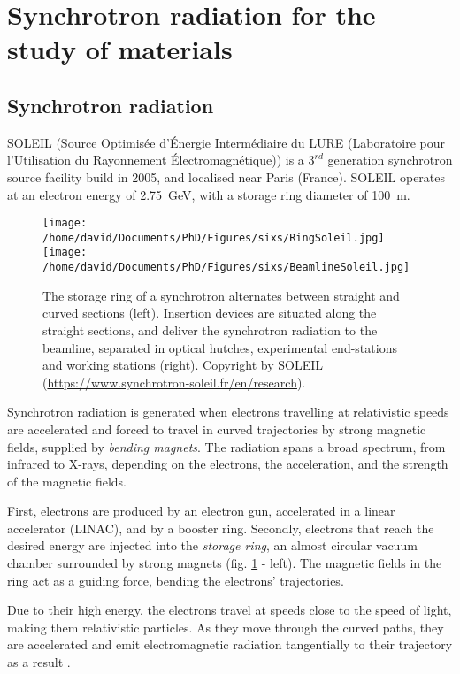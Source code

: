 \section{Synchrotron radiation for the study of materials} \label{sec:SIXS}

\subsection{Synchrotron radiation}

SOLEIL (Source Optimisée d’Énergie Intermédiaire du LURE (Laboratoire pour l’Utilisation du Rayonnement Électromagnétique)) is a $3^{rd}$ generation synchrotron source facility build in 2005, and localised near Paris (France).
SOLEIL operates at an electron energy of \qty{2.75}{\GeV}, with a storage ring diameter of \qty{100}{\m}.

\begin{figure}[!htb]
    \centering
    \texttt{[image: /home/david/Documents/PhD/Figures/sixs/RingSoleil.jpg]}
    \texttt{[image: /home/david/Documents/PhD/Figures/sixs/BeamlineSoleil.jpg]}
    \caption{
    	The storage ring of a synchrotron alternates between straight and curved sections (left).
        Insertion devices are situated along the straight sections, and deliver the synchrotron radiation to the beamline, separated in optical hutches, experimental end-stations and working stations (right).
    	Copyright by SOLEIL (\url{https://www.synchrotron-soleil.fr/en/research}).
    }
    \label{fig:SOLEIL}
\end{figure}

Synchrotron radiation is generated when electrons travelling at relativistic speeds are accelerated and forced to travel in curved trajectories by strong magnetic fields, supplied by \textit{bending magnets}.
The radiation spans a broad spectrum, from infrared to X-rays, depending on the electrons, the acceleration, and the strength of the magnetic fields.

First, electrons are produced by an electron gun, accelerated in a linear accelerator (LINAC), and by a booster ring.
Secondly, electrons that reach the desired energy are injected into the \textit{storage ring}, an almost circular vacuum chamber surrounded by strong magnets (fig. \ref{fig:SOLEIL} - left).
The magnetic fields in the ring act as a guiding force, bending the electrons' trajectories.

Due to their high energy, the electrons travel at speeds close to the speed of light, making them relativistic particles.
As they move through the curved paths, they are accelerated and emit electromagnetic radiation tangentially to their trajectory as a result \parencite{Willmott, NielsenMcMorrow}.

